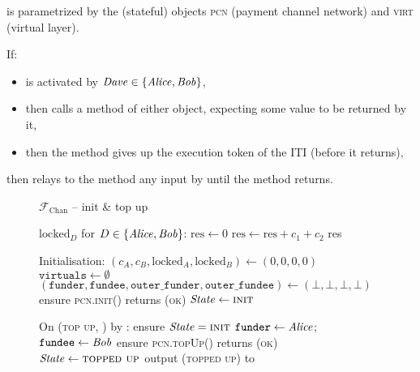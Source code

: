 
\fchan is parametrized by the (stateful) objects \textsc{pcn} (payment channel network)
and \textsc{virt} (virtual layer). 

If:
\begin{itemize}
  \item \fchan is activated by $\mathit{Dave} \in \{\mathit{Alice}, \mathit{Bob}\}$,
  \item \fchan then calls a method of either object, expecting some value to be
  returned by it,
  \item then the method gives up the execution token of the ITI (before it
  returns),
\end{itemize}
then \fchan relays to the method any input by \alice until the method returns.

\begin{figure}[H]
  \begin{systembox}{$\mathcal{F}_{\mathrm{Chan}}$ -- init \& top up}
    \begin{algorithmic}[1]
      \State $\mathrm{locked}_D$ for $D \in \{\mathit{Alice}, \mathit{Bob}\}$:
      \Indent
        \State $\mathrm{res} \gets 0$
          \State $\mathrm{res} \gets \mathrm{res} + c_1 + c_2$
        \EndFor
        \State \Return res
      \EndIndent
      \Statex

      \State Initialisation: 
      \Indent
        \State $(c_A, c_B, \mathrm{locked}_A, \mathrm{locked}_B) \gets (0, 0, 0,
        0)$
        \State $\texttt{virtuals} \gets \emptyset$
        \State $(\texttt{funder}, \texttt{fundee}, \texttt{outer\_funder},
        \texttt{outer\_fundee}) \gets (\bot, \bot, \bot, \bot)$
        \State ensure \textsc{pcn.init}() returns (\textsc{ok})
        \State $\mathit{State} \gets \textsc{init}$
      \EndIndent
      \Statex

      \State On (\textsc{top up}, \bob) by \alice:
      \label{code:functionality:chan:skeleton:init:top_up:start}
      \Indent
        \State ensure $\mathit{State} = \textsc{init}$
        \State $\mathtt{funder} \gets \mathit{Alice}$; $\mathtt{fundee} \gets \mathit{Bob}$
        \State ensure \textsc{pcn.topUp}(\alice) returns (\textsc{ok})
        \State $\mathit{State} \gets \textsc{topped up}$
        \State output (\textsc{topped up}) to \alice
        \label{code:functionality:chan:skeleton:init:top_up:end}
      \EndIndent
    \end{algorithmic}
  \end{systembox}
  \caption{}
  \label{code:functionality:chan:skeleton:init}
\end{figure}

